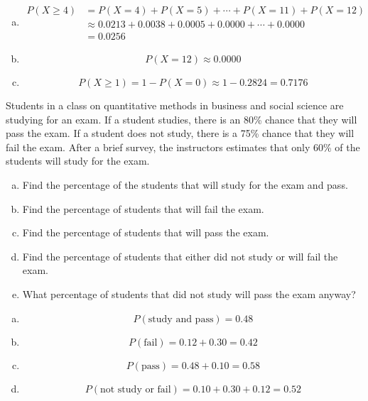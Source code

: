 \documentclass[12pt,letterpaper]{exam}
\begin{document}
\begin{questions}
{\begin{enumerate}[(a)]
\item 
	\[
	\begin{aligned}
	P(X \geq 4)&= P(X= 4) + P(X= 5) + \cdots + P(X= 11) + P(X= 12) \\[0.3cm]
	&\approx 0.0213 + 0.0038 + 0.0005 + 0.0000 + \cdots + 0.0000 \\[0.3cm]
	&= 0.0256
	\end{aligned}
	\] \pspace

\item 
	\[
	P(X= 12) \approx 0.0000
	\] \pspace

\item 
	\[
	P(X \geq 1)= 1 - P(X= 0) \approx 1 - 0.2824= 0.7176
	\]
\end{enumerate}
}



\newpage
\question[15] Students in a class on quantitative methods in business and social science are studying for an exam. If a student studies, there is an 80\% chance that they will pass the exam. If a student does not study, there is a 75\% chance that they will fail the exam. After a brief survey, the instructors estimates that only 60\% of the students will study for the exam. 
	\begin{enumerate}[(a)]
	\item Find the percentage of the students that will study for the exam and pass.
	\item Find the percentage of students that will fail the exam. 
	\item Find the percentage of students that will pass the exam. 
	\item Find the percentage of students that either did not study or will fail the exam.
	\item What percentage of students that did not study will pass the exam anyway?
	\end{enumerate} \pspace

\sol 
\begin{enumerate}[(a)]
\item 
	\[
	P(\text{study and pass})= 0.48
	\] \pspace

\item 
	\[
	P(\text{fail})= 0.12 + 0.30= 0.42
	\] \pspace

\item 
	\[
	P(\text{pass})= 0.48 + 0.10= 0.58
	\] \pspace

\item 
	\[
	P(\text{not study or fail})= 0.10 + 0.30 + 0.12= 0.52
	\] \pspace


\end{enumerate}
\end{questions}
\end{document}
